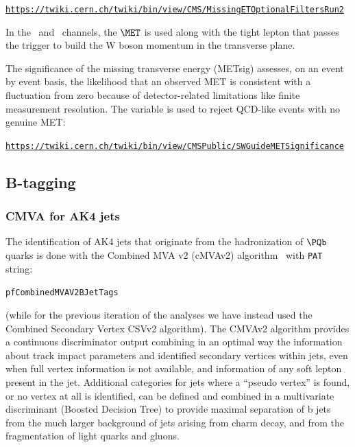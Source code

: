 \begin{center}

\href{https://twiki.cern.ch/twiki/bin/view/CMS/MissingETOptionalFiltersRun2}{\texttt{https://twiki.cern.ch/twiki/bin/view/CMS/MissingETOptionalFiltersRun2}}

\end{center}


In the \WenH\ and \WmnH\ channels, the $\MET$ is used along with the tight lepton that passes the trigger to build the W boson momentum in the transverse plane.

The significance of the missing transverse energy (METsig) assesses, on an event by event basis, the likelihood that an observed MET is consistent with a fluctuation from zero because of detector-related limitations like finite measurement resolution. The variable is used to reject QCD-like events with no genuine MET:

\begin{center}

\href{https://twiki.cern.ch/twiki/bin/view/CMSPublic/SWGuideMETSignificance}{\texttt{https://twiki.cern.ch/twiki/bin/view/CMSPublic/SWGuideMETSignificance}}

\end{center}

\subsection{B-tagging\label{sec:bjets}}
\subsubsection{CMVA for AK4 jets}
The identification of AK4 jets that originate from the hadronization of $\PQb$ quarks
is done with the Combined MVA v2 (cMVAv2)     algorithm~\cite{Chatrchyan:2012jua} with \texttt{PAT} string:
\begin{center}
\texttt{pfCombinedMVAV2BJetTags}
\end{center}
(while for the previous iteration of the analyses we have instead used the Combined Secondary Vertex CSVv2 algorithm).
The CMVAv2 algorithm provides a continuous discriminator output combining
in an optimal way the information about track impact parameters and identified secondary 
vertices within jets,  even when full vertex information is not available, and information of any soft lepton present in the jet.  Additional
categories for jets where a ``pseudo vertex'' is found, or no vertex at all is identified,
can be defined and combined in a multivariate discriminant (Boosted Decision Tree) to provide maximal separation
of b jets from the much larger background of jets arising from charm decay, and from the
fragmentation of light quarks and gluons.

